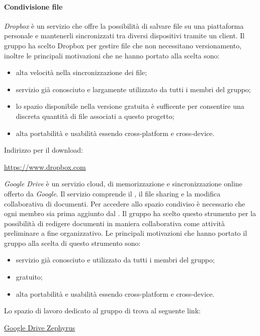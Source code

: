		\paragraph{Condivisione file}\label{sec:GoogleDrive}
		\textit{Dropbox} è un servizio che offre la possibilità di salvare file su una piattaforma  personale e mantenerli sincronizzati tra diversi dispositivi tramite un client.
		Il gruppo ha scelto Dropbox per gestire file che non necessitano versionamento,
		inoltre le principali motivazioni che ne hanno portato alla scelta sono:
		\begin{itemize}
			\item alta velocità nella sincronizzazione dei file;
			\item servizio già conosciuto e largamente utilizzato da tutti i membri del gruppo;
			\item lo spazio disponibile nella versione gratuita è sufficente per consentire una discreta quantità di file associati a questo progetto;
			\item alta portabilità e usabilità essendo cross-platform e cross-device.
		\end{itemize}
		Indirizzo per il download:
		\begin{center}
			\url{https://www.dropbox.com}
		\end{center}
		\textit{Google Drive} è un servizio cloud, di memorizzazione e sincronizzazione online offerto da \textit{Google}. Il servizio comprende il , il file sharing e la modifica collaborativa di documenti. Per accedere allo spazio condiviso è necessario che ogni membro sia prima aggiunto dal \responsabilediprogetto.
		Il gruppo ha scelto questo strumento per la possibilità di redigere documenti in maniera collaborativa come attività preliminare a fine organizzativo.
		Le principali motivazioni che hanno portato il gruppo alla scelta di questo strumento sono:
		\begin{itemize}
			\item servizio già conosciuto e utilizzato da tutti i membri del gruppo;
			\item gratuito;
			\item alta portabilità e usabilità essendo cross-platform e cross-device.
		\end{itemize}
		Lo spazio di lavoro dedicato al gruppo di trova al seguente link:
		\begin{center}
			\href{https://drive.google.com/drive/folders/0Bzwj6VVb_wEeYkhoYkdzVW5qQnM?usp=sharing}{Google Drive Zephyrus}
		\end{center}
